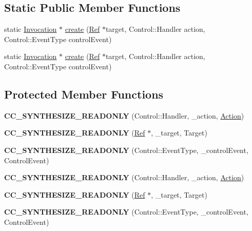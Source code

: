 \subsection*{Static Public Member Functions}
\begin{DoxyCompactItemize}
\item 
static \hyperlink{classInvocation}{Invocation} $\ast$ \hyperlink{classInvocation_a13c66d6fafe3de660a56b38a21dd0adf}{create} (\hyperlink{classRef}{Ref} $\ast$target, Control\+::\+Handler action, Control\+::\+Event\+Type control\+Event)
\item 
static \hyperlink{classInvocation}{Invocation} $\ast$ \hyperlink{classInvocation_aaea5961364e51971202ad2823424a84f}{create} (\hyperlink{classRef}{Ref} $\ast$target, Control\+::\+Handler action, Control\+::\+Event\+Type control\+Event)
\end{DoxyCompactItemize}
\subsection*{Protected Member Functions}
\begin{DoxyCompactItemize}
\item 
\mbox{\label{classInvocation_a1ef9e9f53bde5ab6562a0871c34bb763}} 
{\bfseries C\+C\+\_\+\+S\+Y\+N\+T\+H\+E\+S\+I\+Z\+E\+\_\+\+R\+E\+A\+D\+O\+N\+LY} (Control\+::\+Handler, \+\_\+action, \hyperlink{classAction}{Action})
\item 
\mbox{\label{classInvocation_a6ddb73f4cdd335afb05e5fd9ed29e087}} 
{\bfseries C\+C\+\_\+\+S\+Y\+N\+T\+H\+E\+S\+I\+Z\+E\+\_\+\+R\+E\+A\+D\+O\+N\+LY} (\hyperlink{classRef}{Ref} $\ast$, \+\_\+target, Target)
\item 
\mbox{\label{classInvocation_abccd1098b0f2f5c42276425598959013}} 
{\bfseries C\+C\+\_\+\+S\+Y\+N\+T\+H\+E\+S\+I\+Z\+E\+\_\+\+R\+E\+A\+D\+O\+N\+LY} (Control\+::\+Event\+Type, \+\_\+control\+Event, Control\+Event)
\item 
\mbox{\label{classInvocation_a1ef9e9f53bde5ab6562a0871c34bb763}} 
{\bfseries C\+C\+\_\+\+S\+Y\+N\+T\+H\+E\+S\+I\+Z\+E\+\_\+\+R\+E\+A\+D\+O\+N\+LY} (Control\+::\+Handler, \+\_\+action, \hyperlink{classAction}{Action})
\item 
\mbox{\label{classInvocation_a6ddb73f4cdd335afb05e5fd9ed29e087}} 
{\bfseries C\+C\+\_\+\+S\+Y\+N\+T\+H\+E\+S\+I\+Z\+E\+\_\+\+R\+E\+A\+D\+O\+N\+LY} (\hyperlink{classRef}{Ref} $\ast$, \+\_\+target, Target)
\item 
\mbox{\label{classInvocation_abccd1098b0f2f5c42276425598959013}} 
{\bfseries C\+C\+\_\+\+S\+Y\+N\+T\+H\+E\+S\+I\+Z\+E\+\_\+\+R\+E\+A\+D\+O\+N\+LY} (Control\+::\+Event\+Type, \+\_\+control\+Event, Control\+Event)
\end{DoxyCompactItemize}
